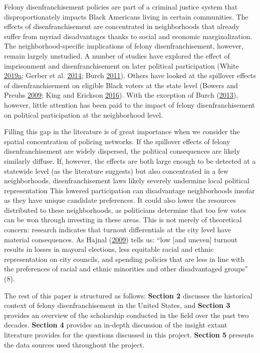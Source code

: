 \documentclass[
  12pt,
]{article}
\begin{document}
Felony disenfranchisement policies are part of a criminal justice system that disproportionately impacts Black Americans living in certain communities. The effects of disenfranchisement are concentrated in neighborhoods that already suffer from myriad disadvantages thanks to social and economic marginalization. The neighborhood-specific implications of felony disenfranchisement, however, remain largely unstudied. A number of studies have explored the effect of imprisonment and disenfranchisement on later political participation (White \protect\hyperlink{ref-White2019}{2019}\protect\hyperlink{ref-White2019}{a}; Gerber et al. \protect\hyperlink{ref-Gerber2014}{2014}; Burch \protect\hyperlink{ref-Burch2011}{2011}). Others have looked at the spillover effects of disenfranchisement on eligible Black voters at the state level (Bowers and Preuhs \protect\hyperlink{ref-Bowers2009}{2009}; King and Erickson \protect\hyperlink{ref-King2016}{2016}). With the exception of Burch (\protect\hyperlink{ref-Burch2013}{2013}), however, little attention has been paid to the impact of felony disenfranchisement on political participation at the neighborhood level.

Filling this gap in the literature is of great importance when we consider the spatial concentration of policing networks. If the spillover effects of felony disenfranchisement are widely dispersed, the political consequences are likely similarly diffuse. If, however, the effects are both large enough to be detected at a statewide level (as the literature suggests) but also concentrated in a few neighborhoods, disenfranchisement laws likely severely undermine local political representation This lowered participation can disadvantage neighborhoods insofar as they have unique candidate preferences. It could also lower the resources distributed to these neighborhoods, as politicians determine that too few votes can be won through investing in these areas. This is not merely of theoretical concern: research indicates that turnout differentials at the city level have material consequences. As Hajnal (\protect\hyperlink{ref-Hajnal2009}{2009}) tells us: ``low {[}and uneven{]} turnout results in losses in mayoral elections, less equitable racial and ethnic representation on city councils, and spending policies that are less in line with the preferences of racial and ethnic minorities and other disadvantaged groups'' (8).

The rest of this paper is structured as follows: \textbf{Section 2} discusses the historical context of felony disenfranchisement in the United States, and \textbf{Section 3} provides an overview of the scholarship conducted in the field over the past two decades. \textbf{Section 4} provides an in-depth discussion of the insight extant literature provides for the questions discussed in this project. \textbf{Section 5} presents the data sources used throughout the project.
\end{document}

